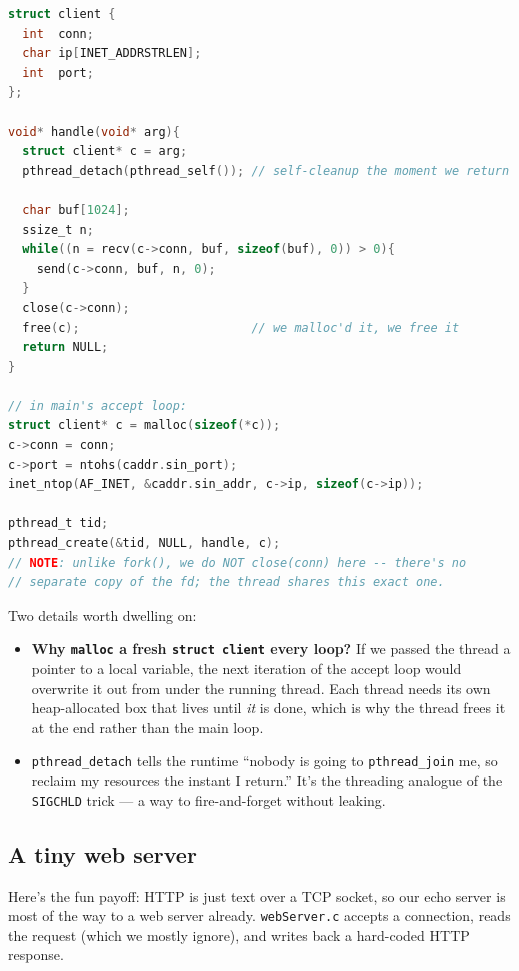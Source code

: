 \documentclass[11pt]{article}
\begin{document}
\begin{lstlisting}[language=C]
struct client {
  int  conn;
  char ip[INET_ADDRSTRLEN];
  int  port;
};

void* handle(void* arg){
  struct client* c = arg;
  pthread_detach(pthread_self()); // self-cleanup the moment we return

  char buf[1024];
  ssize_t n;
  while((n = recv(c->conn, buf, sizeof(buf), 0)) > 0){
    send(c->conn, buf, n, 0);
  }
  close(c->conn);
  free(c);                        // we malloc'd it, we free it
  return NULL;
}

// in main's accept loop:
struct client* c = malloc(sizeof(*c));
c->conn = conn;
c->port = ntohs(caddr.sin_port);
inet_ntop(AF_INET, &caddr.sin_addr, c->ip, sizeof(c->ip));

pthread_t tid;
pthread_create(&tid, NULL, handle, c);
// NOTE: unlike fork(), we do NOT close(conn) here -- there's no
// separate copy of the fd; the thread shares this exact one.
\end{lstlisting}

Two details worth dwelling on:
\begin{itemize}
  \item \textbf{Why \texttt{malloc} a fresh \texttt{struct client}
    every loop?} If we passed the thread a pointer to a local
    variable, the next iteration of the accept loop would overwrite
    it out from under the running thread. Each thread needs its own
    heap-allocated box that lives until \emph{it} is done, which is
    why the thread frees it at the end rather than the main loop.
  \item \texttt{pthread\_detach} tells the runtime ``nobody is going
    to \texttt{pthread\_join} me, so reclaim my resources the instant
    I return.'' It's the threading analogue of the \texttt{SIGCHLD}
    trick --- a way to fire-and-forget without leaking.
\end{itemize}

\subsection*{A tiny web server}

Here's the fun payoff: HTTP is just text over a TCP socket, so our
echo server is most of the way to a web server already.
\texttt{webServer.c} accepts a connection, reads the request
(which we mostly ignore), and writes back a hard-coded HTTP
response.
\end{document}
